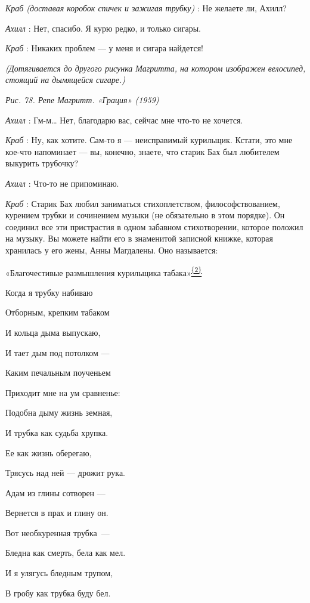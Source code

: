 \emph{Краб (доставая коробок спичек и зажигая трубку)} : Не желаете ли, Ахилл?

\emph{Ахилл} : Нет, спасибо. Я курю редко, и только сигары.

\emph{Краб} : Никаких проблем --- у меня и сигара найдется!

\emph{(Дотягивается до другого рисунка Магритта, на котором изображен велосипед, стоящий на дымящейся сигаре.)}

\emph{Рис. 78. Репе Магритт. «Грация» (1959)}

\emph{Ахилл} : Гм-м\ldots{} Нет, благодарю вас, сейчас мне что-то не хочется.

\emph{Краб} : Ну, как хотите. Сам-то я --- неисправимый курильщик. Кстати, это мне кое-что напоминает --- вы, конечно, знаете, что старик Бах был любителем выкурить трубочку?

\emph{Ахилл} : Что-то не припоминаю.

\emph{Краб} : Старик Бах любил заниматься стихоплетством, философствованием, курением трубки и сочинением музыки (не обязательно в этом порядке). Он соединил все эти пристрастия в одном забавном стихотворении, которое положил на музыку. Вы можете найти его в знаменитой записной книжке, которая хранилась у его жены, Анны Магдалены. Оно называется:

«Благочестивые размышления курильщика табака»\protect\hyperlink{c_2}{\textsuperscript{\uline{\{2\}}}}

Когда я трубку набиваю

Отборным, крепким табаком

И кольца дыма выпускаю,

И тает дым под потолком ---

Каким печальным поученьем

Приходит мне на ум сравненье:

Подобна дыму жизнь земная,

И трубка как судьба хрупка.

Ее как жизнь оберегаю,

Трясусь над ней --- дрожит рука.

Адам из глины сотворен ---

Вернется в прах и глину он.

Вот необкуренная трубка~---

Бледна как смерть, бела как мел.

И я улягусь бледным трупом,

В гробу как трубка буду бел.

